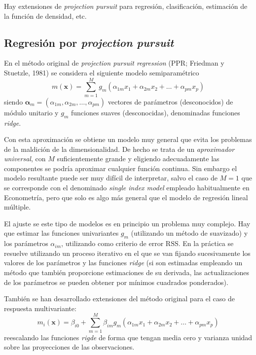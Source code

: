 \documentclass[
]{book}
\theoremstyle{break}
\theoremstyle{definition}
\theoremstyle{definition}
\theoremstyle{definition}
\theoremstyle{remark}
\begin{document}
Hay extensiones de \emph{projection pursuit} para regresión, clasificación, estimación de la función de densidad, etc.

\hypertarget{ppr}{%
\subsection{\texorpdfstring{Regresión por \emph{projection pursuit}}{Regresión por projection pursuit}}\label{ppr}}

En el método original de \emph{projection pursuit regression} (PPR; Friedman y Stuetzle, 1981) se considera el siguiente modelo semiparamétrico
\[m(\mathbf{x}) = \sum_{m=1}^M g_m (\alpha_{1m}x_1 + \alpha_{2m}x_2 + \ldots + \alpha_{pm}x_p)\]
siendo \(\boldsymbol{\alpha}_m = (\alpha_{1m}, \alpha_{2m}, \ldots, \alpha_{pm})\) vectores de parámetros (desconocidos) de módulo unitario y \(g_m\) funciones suaves (desconocidas), denominadas funciones \emph{ridge}.

Con esta aproximación se obtiene un modelo muy general que evita los problemas de la maldición de la dimensionalidad.
De hecho se trata de un \emph{aproximador universal}, con \(M\) suficientemente grande y eligiendo adecuadamente las componentes se podría aproximar cualquier función continua.
Sin embargo el modelo resultante puede ser muy difícil de interpretar, salvo el caso de \(M=1\) que se corresponde con el denominado \emph{single index model} empleado habitualmente en Econometría, pero que solo es algo más general que el modelo de regresión lineal múltiple.

El ajuste se este tipo de modelos es en principio un problema muy complejo.
Hay que estimar las funciones univariantes \(g_m\) (utilizando un método de suavizado) y los parámetros \(\alpha_{im}\), utilizando como criterio de error \(\mbox{RSS}\).
En la práctica se resuelve utilizando un proceso iterativo en el que se van fijando sucesivamente los valores de los parámetros y las funciones \emph{ridge} (si son estimadas empleando un método que también proporcione estimaciones de su derivada, las actualizaciones de los parámetros se pueden obtener por mínimos cuadrados ponderados).

También se han desarrollado extensiones del método original para el caso de respuesta multivariante:
\[m_i(\mathbf{x}) = \beta_{i0} + \sum_{m=1}^M \beta_{im} g_m (\alpha_{1m}x_1 + \alpha_{2m}x_2 + \ldots + \alpha_{pm}x_p)\]
reescalando las funciones \emph{rigde} de forma que tengan media cero y varianza unidad sobre las proyecciones de las observaciones.
\end{document}
